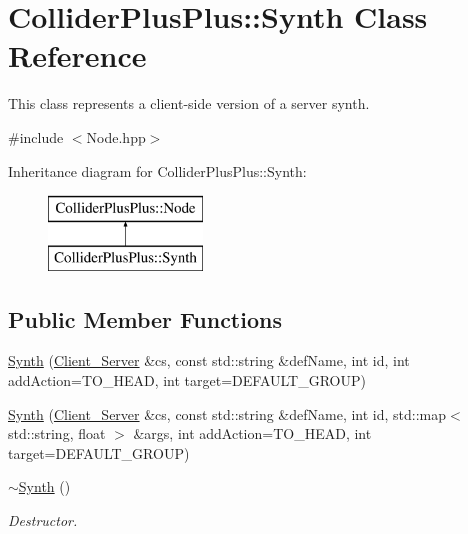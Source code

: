 \hypertarget{classColliderPlusPlus_1_1Synth}{\section{Collider\-Plus\-Plus\-:\-:Synth Class Reference}
\label{classColliderPlusPlus_1_1Synth}
}


This class represents a client-\/side version of a server synth.  




{\ttfamily \#include $<$Node.\-hpp$>$}

Inheritance diagram for Collider\-Plus\-Plus\-:\-:Synth\-:\begin{figure}[H]
\begin{center}
\leavevmode
\includegraphics[height=2.000000cm]{classColliderPlusPlus_1_1Synth}
\end{center}
\end{figure}
\subsection*{Public Member Functions}
\begin{DoxyCompactItemize}
\item 
\hyperlink{classColliderPlusPlus_1_1Synth_a09da4e7d91e4a71c1b63eec5b03da20f}{Synth} (\hyperlink{classColliderPlusPlus_1_1Client__Server}{Client\-\_\-\-Server} \&cs, const std\-::string \&def\-Name, int id, int add\-Action=T\-O\-\_\-\-H\-E\-A\-D, int target=D\-E\-F\-A\-U\-L\-T\-\_\-\-G\-R\-O\-U\-P)
\item 
\hyperlink{classColliderPlusPlus_1_1Synth_a211326fb8abb51bde37c0db0ee8a66b2}{Synth} (\hyperlink{classColliderPlusPlus_1_1Client__Server}{Client\-\_\-\-Server} \&cs, const std\-::string \&def\-Name, int id, std\-::map$<$ std\-::string, float $>$ \&args, int add\-Action=T\-O\-\_\-\-H\-E\-A\-D, int target=D\-E\-F\-A\-U\-L\-T\-\_\-\-G\-R\-O\-U\-P)
\item 
\hypertarget{classColliderPlusPlus_1_1Synth_a1fb61bf548db414b4dc543eac83216ae}{\hyperlink{classColliderPlusPlus_1_1Synth_a1fb61bf548db414b4dc543eac83216ae}{$\sim$\-Synth} ()}\label{classColliderPlusPlus_1_1Synth_a1fb61bf548db414b4dc543eac83216ae}

\begin{DoxyCompactList}\small\item\em Destructor. \end{DoxyCompactList}\end{DoxyCompactItemize}
